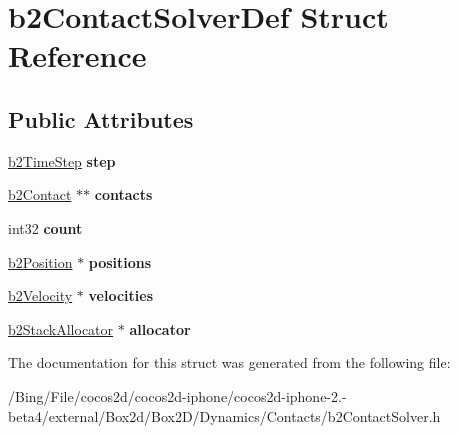 \hypertarget{structb2_contact_solver_def}{\section{b2\-Contact\-Solver\-Def Struct Reference}
\label{structb2_contact_solver_def}
}
\subsection*{Public Attributes}
\begin{DoxyCompactItemize}
\item 
\hypertarget{structb2_contact_solver_def_a544604c01e6606ab54b8ccd5289a7ac7}{\hyperlink{structb2_time_step}{b2\-Time\-Step} {\bfseries step}}\label{structb2_contact_solver_def_a544604c01e6606ab54b8ccd5289a7ac7}

\item 
\hypertarget{structb2_contact_solver_def_a4b9d708e3122cab8d9dabeafefc7a9af}{\hyperlink{classb2_contact}{b2\-Contact} $\ast$$\ast$ {\bfseries contacts}}\label{structb2_contact_solver_def_a4b9d708e3122cab8d9dabeafefc7a9af}

\item 
\hypertarget{structb2_contact_solver_def_ae977ea1cee4b7b9ee99210d9b66f88ea}{int32 {\bfseries count}}\label{structb2_contact_solver_def_ae977ea1cee4b7b9ee99210d9b66f88ea}

\item 
\hypertarget{structb2_contact_solver_def_aaf1432d040aa6279d91d8c9f24a4728a}{\hyperlink{structb2_position}{b2\-Position} $\ast$ {\bfseries positions}}\label{structb2_contact_solver_def_aaf1432d040aa6279d91d8c9f24a4728a}

\item 
\hypertarget{structb2_contact_solver_def_ae839e5c5464aa54c1ad8ce1634b49a1f}{\hyperlink{structb2_velocity}{b2\-Velocity} $\ast$ {\bfseries velocities}}\label{structb2_contact_solver_def_ae839e5c5464aa54c1ad8ce1634b49a1f}

\item 
\hypertarget{structb2_contact_solver_def_a54198ac9886a988b9ffd06cf28c4c45c}{\hyperlink{classb2_stack_allocator}{b2\-Stack\-Allocator} $\ast$ {\bfseries allocator}}\label{structb2_contact_solver_def_a54198ac9886a988b9ffd06cf28c4c45c}

\end{DoxyCompactItemize}


The documentation for this struct was generated from the following file\-:\begin{DoxyCompactItemize}
\item 
/\-Bing/\-File/cocos2d/cocos2d-\/iphone/cocos2d-\/iphone-\/2.-\/beta4/external/\-Box2d/\-Box2\-D/\-Dynamics/\-Contacts/b2\-Contact\-Solver.\-h\end{DoxyCompactItemize}
